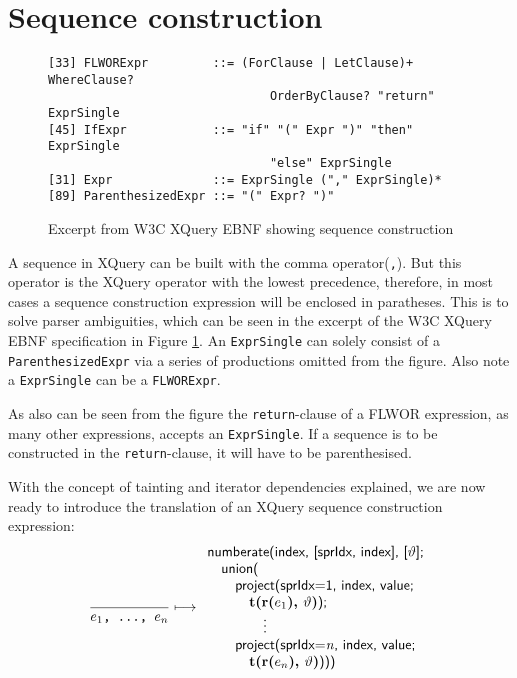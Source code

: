 \section{Sequence construction}
\label{sect:trans:TD:seqBuild}

\begin{figure}[h]
\begin{Verbatim}
[33] FLWORExpr         ::= (ForClause | LetClause)+ WhereClause? 
                               OrderByClause? "return" ExprSingle
[45] IfExpr            ::= "if" "(" Expr ")" "then" ExprSingle 
                               "else" ExprSingle
[31] Expr              ::= ExprSingle ("," ExprSingle)*
[89] ParenthesizedExpr ::= "(" Expr? ")"
\end{Verbatim}
\caption[Excerpt from W3C XQuery EBNF]{Excerpt from W3C XQuery EBNF showing
sequence construction}
\label{fig:trans:TD:seqEBNF}
\end{figure}

A sequence in XQuery can be built with the comma operator(\texttt{,}). But this operator is the XQuery operator
with the lowest precedence, therefore, in most cases a sequence construction expression will be enclosed in
paratheses. This is to solve parser ambiguities, which can be seen in the excerpt of the W3C XQuery EBNF
specification\cite{w3c00} in Figure \ref{fig:trans:TD:seqEBNF}. An \texttt{ExprSingle} can solely consist of a
\texttt{ParenthesizedExpr} via a series of productions omitted from the figure. Also note a \texttt{ExprSingle}
can be a \texttt{FLWORExpr}.

As also can be seen from the figure the \texttt{return}-clause of a FLWOR expression, as many other expressions,
accepts an \texttt{ExprSingle}. If a sequence is to be constructed in the \texttt{return}-clause, it will have to
be parenthesised.

With the concept of tainting and iterator dependencies explained, we are now ready to introduce the translation of
an XQuery sequence construction expression:
\begin{equation}
\frac{}{e_{1}\mbox{\texttt{, \ldots, }}e_{n}}\longmapsto
\begin{array}{l}
\mbox{\textsf{numberate(index, [sprIdx, index], [}}\vartheta\mbox{\textsf{];}} \\ \quad
\mbox{\textsf{union(}} \\ \quad \quad
\mbox{\textsf{project(sprIdx=1, index, value; }} \\ \quad \quad \quad
\mbox{\textbf{t(r(}}e_{1}\mbox{\textbf{), }}\vartheta\mbox{\textbf{)}\textsf{);}} \\ \quad \quad
\qquad\vdots\\ \quad \quad
\mbox{\textsf{project(sprIdx=}\textit{n}\textsf{, index, value; }} \\ \quad \quad \quad
\mbox{\textbf{t(r(}}e_{n}\mbox{\textbf{), }}\vartheta\mbox{\textbf{)}\textsf{)))}}
\end{array}
\label{rule:trans:TD:seqConstr}
\end{equation}

